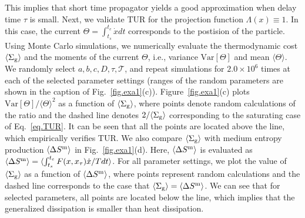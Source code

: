 \documentclass[pre,
twocolumn,
]{revtex4-1}
\theoremstyle{definition}
\theoremstyle{definition}
\newcommand{\mca}{\mathcal}
\newcommand{\mrm}{\mathrm}
\newcommand{\avg}[1]{\langle #1\rangle}
\newcommand{\inl}[1]{$ #1 $}
\begin{document}
This implies that short time propagator yields a good approximation when delay time \inl{\tau} is small.
Next, we validate TUR for the projection function \inl{\Lambda(x)\equiv 1}.
In this case, the current \inl{\Theta=\int_{t_s}^{t_e}\dot{x}dt} corresponds to the postision of the particle.
Using Monte Carlo simulations, we numerically evaluate the thermodynamic cost \inl{\avg{\Sigma_{\rm g}}} and the moments of the current \inl{\Theta}, i.e., variance \inl{\mrm{Var}[\Theta]} and mean \inl{\avg{\Theta}}.
We randomly select \inl{a,b,c,D,\tau,\mca{T}}, and repeat simulations for \inl{2.0\times 10^6} times at each of the selected parameter settings (ranges of the random parameters are shown in the caption of Fig.~\ref{fig.exa1}(c)).
Figure~\ref{fig.exa1}(c) plots \inl{\mrm{Var}[\Theta]/\avg{\Theta}^2} as a function of \inl{\avg{\Sigma_{\rm g}}}, where points denote random calculations of the ratio and the dashed line denotes \inl{2/\avg{\Sigma_{\rm g}}} corresponding to the saturating case of Eq.~\eqref{eq.TUR}.
It can be seen that all the points are located above the line, which empirically verifies TUR.
We also compare \inl{\avg{\Sigma_{\rm g}}} with medium entropy production \inl{\avg{\Delta S^{\rm m}}} in Fig.~\ref{fig.exa1}(d).
Here, \inl{\avg{\Delta S^{\rm m}}} is evaluated as \inl{\avg{\Delta S^{\rm m}}=\avg{\int_{t_s}^{t_e}F(x,x_\tau)\dot{x}/Tdt}}.
For all parameter settings, we plot the value of \inl{\avg{\Sigma_{\rm g}}} as a function of \inl{\avg{\Delta S^{\rm m}}}, where points represent random calculations and the dashed line corresponds to the case that \inl{\avg{\Sigma_{\rm g}}=\avg{\Delta S^{\rm m}}}.
We can see that for selected parameters, all points are located below the line, which implies that the generalized dissipation is smaller than heat dissipation.
\end{document}
